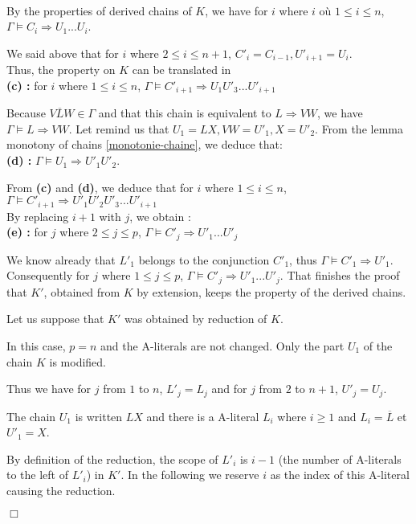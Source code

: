 \documentclass{article}
\newenvironment{preuve}{\noindent {\em Proof :}\ }{{\hfill
    $\Box$}\vspace{.5pc}} \newcommand{\sg}{\!\!<\!\!}
\begin{document}
\begin{preuve}
\begin{itemrond}
By the properties of derived chains of $K$, we have for $i$ where
 $i$ où $1 \leq i \leq n$, 
$\Gamma \models C_i \Rightarrow U_1...U_i$. 

We said above that for $i$ where $2 \leq i \leq n+1$, $C'_i = C_{i-1}, U'_{i+1}=U_i$.\\
Thus, the property on $K$ can be translated in \\
\textbf{(c) : } for $i$ where $1 \leq i \leq n$, $\Gamma \models C'_{i+1} \Rightarrow U_1U'_3...U'_{i+1}$

Because $V \overline{L}W \in \Gamma$ and that this chain is equivalent to  $L \Rightarrow VW$, we have
$\Gamma \models L \Rightarrow VW$. Let remind us that $U_1 = LX, VW = U'_1, X = U'_2$. 
From the lemma monotony of chains \ref{monotonie-chaine}, we deduce that:\\
\textbf{(d) : } $\Gamma \models U_1 \Rightarrow U'_1U'_2$.

From \textbf{(c)} and \textbf{(d)}, we deduce that for $i$ where 
$1 \leq i \leq n$, $\Gamma \models C'_{i+1} \Rightarrow U'_1U'_2U'_3...U'_{i+1}$\\
By replacing $i+1$ with $j$, we obtain :\\
\textbf{(e) : } for $j$ where $2 \leq j \leq p$, $\Gamma \models C'_j \Rightarrow U'_1...U'_j$

We know already that  $L'_1$ belongs to the conjunction $C'_1$, thus $\Gamma \models C'_1 \Rightarrow U'_1$.
Consequently for $j$ where $1 \leq j \leq p$, $\Gamma \models C'_j \Rightarrow U'_1...U'_j$.  
That finishes the proof that $K'$, obtained from $K$ by extension, keeps the property of the derived chains.



\item Let us suppose that $K'$ was obtained by reduction of $K$.

In this case, $p =  n$ and the A-literals are not changed. Only the part $U_1$ of the chain $K$ is modified.

Thus we have for $j$ from $1$ to $n$,  $L'_j = L_j$ and for  $j$ from $2$ to $n+1$, $U'_j = U_j$.

The chain $U_1$ is written $LX$ and there is a A-literal $L_i$ where $i \geq 1$ and $L_i = \overline{L}$ et $U'_1 = X$.

By definition of the reduction,  the scope of 
 $L'_i$  is  $i-1$ (the number of A-literals to the left of $L'_i$) in $K'$. 
In the following we reserve $i$ as the index of this A-literal causing the reduction.


\end{itemrond}
\end{preuve}
\end{document}
